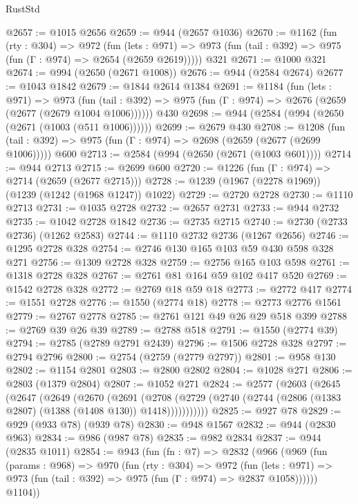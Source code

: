 \begin{lexlean}{RustStd}
\begin{coremodule}
@2657 := @1015 @2656
@2659 := @944 (@2657 @1036)
@2670 := @1162
    (fun (rty : @304) =>
    @972
      (fun (lets : @971) =>
      @973 (fun (tail : @392) => @975 (fun (Γ : @974) => @2654 (@2659 @2619)))))
    @321
@2671 := @1000 @321
@2674 := @994 (@2650 (@2671 @1008))
@2676 := @944 (@2584 @2674)
@2677 := @1043 @1842
@2679 := @1844 @2614 @1384
@2691 := @1184
    (fun (lets : @971) =>
    @973 (fun (tail : @392) => @975 (fun (Γ : @974) => @2676 (@2659 (@2677 (@2679 @1004 @1006))))))
    @430
@2698 := @944 (@2584 (@994 (@2650 (@2671 (@1003 (@511 @1006))))))
@2699 := @2679 @430
@2708 := @1208
    (fun (tail : @392) => @975 (fun (Γ : @974) => @2698 (@2659 (@2677 (@2699 @1006)))))
    @600
@2713 := @2584 (@994 (@2650 (@2671 (@1003 @601))))
@2714 := @944 @2713
@2715 := @2699 @600
@2720 := @1226 (fun (Γ : @974) => @2714 (@2659 (@2677 @2715)))
@2728 := @1239 (@1967 (@2278 @1969)) (@1239 (@1242 (@1968 @1247)) @1022)
@2729 := @2720 @2728
@2730 := @1110 @2713
@2731 := @1035 @2728
@2732 := @2657 @2731
@2733 := @944 @2732
@2735 := @1042 @2728 @1842
@2736 := @2735 @2715
@2740 := @2730 (@2733 @2736) (@1262 @2583)
@2744 := @1110 @2732 @2736 (@1267 @2656)
@2746 := @1295 @2728 @328
@2754 := @2746 @130 @165 @103 @59 @430 @598 @328 @271
@2756 := @1309 @2728 @328
@2759 := @2756 @165 @103 @598
@2761 := @1318 @2728 @328
@2767 := @2761 @81 @164 @59 @102 @417 @520
@2769 := @1542 @2728 @328
@2772 := @2769 @18 @59 @18
@2773 := @2772 @417
@2774 := @1551 @2728
@2776 := @1550 (@2774 @18)
@2778 := @2773 @2776 @1561
@2779 := @2767 @2778
@2785 := @2761 @121 @49 @26 @29 @518 @399
@2788 := @2769 @39 @26 @39
@2789 := @2788 @518
@2791 := @1550 (@2774 @39)
@2794 := @2785 (@2789 @2791 @2439)
@2796 := @1506 @2728 @328
@2797 := @2794 @2796
@2800 := @2754 (@2759 (@2779 @2797))
@2801 := @958 @130
@2802 := @1154 @2801
@2803 := @2800 @2802
@2804 := @1028 @271
@2806 := @2803 (@1379 @2804)
@2807 := @1052 @271
@2824 := @2577
    (@2603
      (@2645
        (@2647
          (@2649
            (@2670
              (@2691
                (@2708
                  (@2729 (@2740 (@2744 (@2806 (@1383 @2807) (@1388 (@1408 @130)) @1418)))))))))))
@2825 := @927 @78
@2829 := @929 (@933 @78) (@939 @78)
@2830 := @948 @1567
@2832 := @944 (@2830 @963)
@2834 := @986 (@987 @78)
@2835 := @982 @2834
@2837 := @944 (@2835 @1011)
@2854 := @943
    (fun (fn : @7) =>
    @2832
      (@966
        (@969
          (fun (params : @968) =>
          @970
            (fun (rty : @304) =>
            @972
              (fun (lets : @971) =>
              @973 (fun (tail : @392) => @975 (fun (Γ : @974) => @2837 @1058))))))
        @1104))

\end{coremodule}
\end{lexlean}
